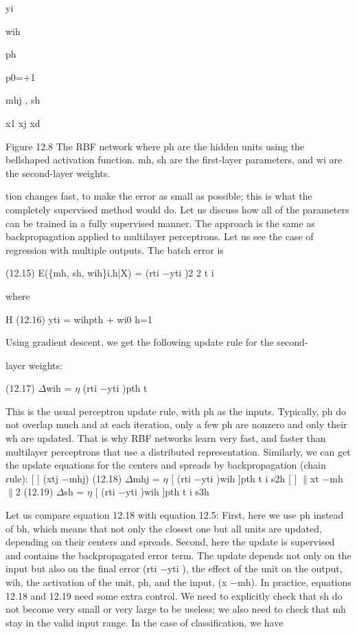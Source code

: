 yi

wih

ph

p0=+1

mhj , sh

x1 xj xd

Figure 12.8 The RBF network where ph are the hidden units using the bellshaped activation function. mh, sh are the first-layer parameters, and wi are the second-layer weights.

tion changes fast, to make the error as small as possible; this is what the completely supervised method would do. Let us discuss how all of the parameters can be trained in a fully supervised manner. The approach is the same as backpropagation applied to multilayer perceptrons. Let us see the case of regression with multiple outputs. The batch error is

(12.15) E(\{mh, sh, wih\}i,h|X) = (rti $-$yti )2 2 t i

where

H (12.16) yti = wihpth + wi0 h=1

Using gradient descent, we get the following update rule for the second-

layer weights:

(12.17) $\Delta$wih = $\eta$ (rti $-$yti )pth t

This is the usual perceptron update rule, with ph as the inputs. Typically, ph do not overlap much and at each iteration, only a few ph are nonzero and only their wh are updated. That is why RBF networks learn very fast, and faster than multilayer perceptrons that use a distributed representation. Similarly, we can get the update equations for the centers and spreads by backpropagation (chain rule): [ ] (xtj $-$mhj) (12.18) $\Delta$mhj = $\eta$ [ (rti $-$yti )wih ]pth t i s2h [ ] $\parallel$xt $-$mh$\parallel$2 (12.19) $\Delta$sh = $\eta$ [ (rti $-$yti )wih ]pth t i s3h

Let us compare equation 12.18 with equation 12.5: First, here we use ph instead of bh, which means that not only the closest one but all units are updated, depending on their centers and spreads. Second, here the update is supervised and contains the backpropagated error term. The update depends not only on the input but also on the final error (rti $-$yti ), the effect of the unit on the output, wih, the activation of the unit, ph, and the input, (x $-$mh). In practice, equations 12.18 and 12.19 need some extra control. We need to explicitly check that sh do not become very small or very large to be useless; we also need to check that mh stay in the valid input range. In the case of classification, we have

